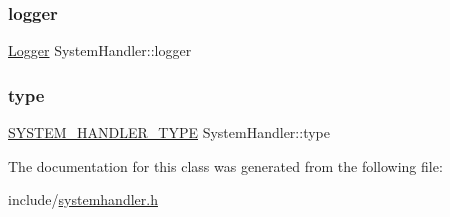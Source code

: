 \subsubsection{\texorpdfstring{logger}{logger}}
{\footnotesize\ttfamily \hyperlink{classLogger}{Logger} System\+Handler\+::logger\hspace{0.3cm}{\ttfamily [protected]}}

\mbox{\label{classSystemHandler_a8ca6090af683e8555051681fd31cd865}} 
\subsubsection{\texorpdfstring{type}{type}}
{\footnotesize\ttfamily \hyperlink{statics_8h_a28f867553077bc713fdf8921a9226e2e}{S\+Y\+S\+T\+E\+M\+\_\+\+H\+A\+N\+D\+L\+E\+R\+\_\+\+T\+Y\+PE} System\+Handler\+::type\hspace{0.3cm}{\ttfamily [protected]}}



The documentation for this class was generated from the following file\+:\begin{DoxyCompactItemize}
\item 
include/\hyperlink{systemhandler_8h}{systemhandler.\+h}\end{DoxyCompactItemize}
